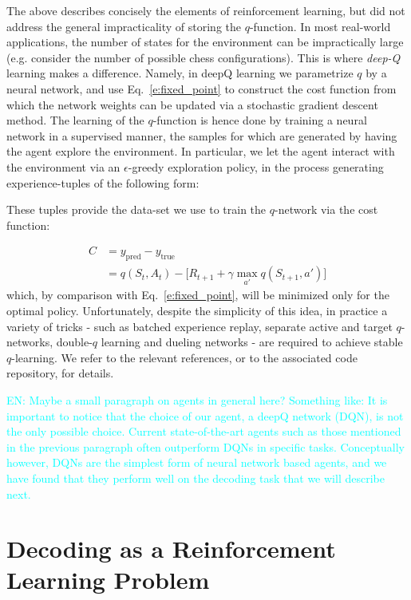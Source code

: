 \documentclass[twocolumn,preprintnumbers,amsmath,amssymb,notitlepage,nofootinbib,longbibliography,superscriptaddress,aps,pra,10pt]{revtex4-1}
\newcommand{\en}[1]{\textcolor{Cyan}{EN: #1}}
\begin{document}
	The above describes concisely the elements of reinforcement learning, but did not address the general impracticality of storing the $q$-function. In most real-world applications,
	the number of states for the environment can be impractically large (e.g. consider the number of possible chess configurations). This is where \textit{deep-Q} learning
	makes a difference. Namely, in deepQ learning we parametrize $q$ by a neural network, and use Eq.~\eqref{e:fixed_point} to construct the cost function from which the
	network weights can be updated via a stochastic gradient descent method. The learning of the $q$-function is hence done by training a neural network in a supervised manner,
	the samples for which are generated by having the agent explore the environment. In particular, we let the agent interact with the environment via an
	$\epsilon$-greedy exploration policy, in the process generating experience-tuples of the following form:

	\begin{equation}
		[S_t,A_t,R_{t+1},S_{t+1}]
	\end{equation}
	These tuples provide the data-set we use to train the $q$-network via the cost function:

	\begin{align}
		C &= y_{\mathrm{pred}} - y_{\mathrm{true}}\\
		&= q(S_t,A_t) - \big[R_{t+1} + \gamma\max_{a'}q(S_{t+1},a') \big]
	\end{align}
	which, by comparison with Eq.~\eqref{e:fixed_point}, will be minimized only for the optimal policy.
	Unfortunately, despite the simplicity of this idea, in practice a variety of tricks - such as batched experience replay, separate active and target $q$-networks,
	double-$q$ learning and dueling networks - are required to achieve stable $q$-learning.	We refer to the relevant references, or to the associated code repository, for details.

	\en{Maybe a small paragraph on agents in general here? Something like: It is important to notice that the choice of our agent, a deepQ network (DQN), is not the only
	possible choice. Current state-of-the-art agents such as those mentioned in the previous paragraph often outperform DQNs in specific tasks. Conceptually however, DQNs are the
	simplest form of neural network based agents, and we have found that they perform well on the decoding task that we will describe next.}

\section{Decoding as a Reinforcement Learning Problem}\label{s:decoding_as_rl}
\end{document}
